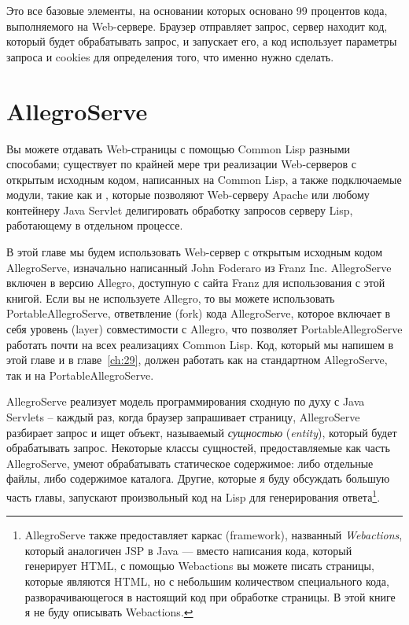 Это все базовые элементы, на основании которых основано 99 процентов кода, выполняемого на
Web-сервере. Браузер отправляет запрос, сервер находит код, который будет обрабатывать
запрос, и запускает его, а код использует параметры запроса и cookies для определения
того, что именно нужно сделать.

\section{AllegroServe}

Вы можете отдавать Web-страницы с помощью Common Lisp разными способами; существует по
крайней мере три реализации Web-серверов с открытым исходным кодом, написанных на Common
Lisp, а также подключаемые модули, такие как
 и
, которые позволяют Web-серверу Apache
или любому контейнеру Java Servlet делигировать обработку запросов серверу Lisp,
работающему в отдельном процессе.

В этой главе мы будем использовать Web-сервер с открытым исходным кодом AllegroServe,
изначально написанный John Foderaro из Franz Inc. AllegroServe включен в версию Allegro,
доступную с сайта Franz для использования с этой книгой. Если вы не используете Allegro,
то вы можете использовать PortableAllegroServe, ответвление (fork) кода AllegroServe,
которое включает в себя уровень (layer) совместимости с Allegro, что позволяет
PortableAllegroServe работать почти на всех реализациях Common Lisp. Код, который мы
напишем в этой главе и в главе~\ref{ch:29}, должен работать как на стандартном
AllegroServe, так и на PortableAllegroServe.

AllegroServe реализует модель программирования сходную по духу с Java Servlets -- каждый
раз, когда браузер запрашивает страницу, AllegroServe разбирает запрос и ищет объект,
называемый \textit{сущностью} (\textit{entity}), который будет обрабатывать
запрос. Некоторые классы сущностей, предоставляемые как часть AllegroServe, умеют
обрабатывать статическое содержимое: либо отдельные файлы, либо содержимое
каталога. Другие, которые я буду обсуждать большую часть главы, запускают произвольный код
на Lisp для генерирования ответа\footnote{AllegroServe также предоставляет каркас
  (framework), названный \textit{Webactions}, который аналогичен JSP в Java --- вместо
  написания кода, который генерирует HTML, с помощью Webactions вы можете писать страницы,
  которые являются HTML, но с небольшим количеством специального кода, разворачивающегося
  в настоящий код при обработке страницы. В этой книге я не буду описывать Webactions.}.

